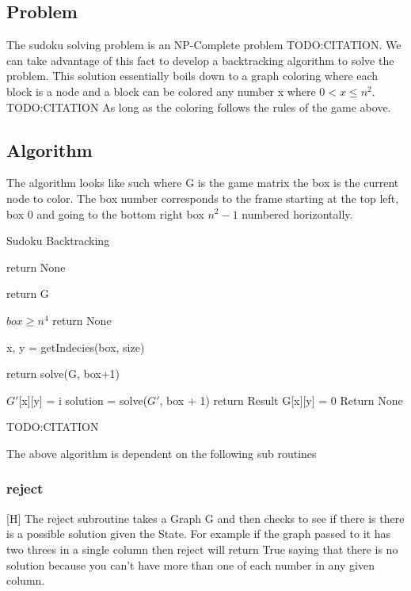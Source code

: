 \documentclass{sig-alternate}
\begin{document}
\subsection{Problem}
The sudoku solving problem is an NP-Complete problem TODO:CITATION. We can take
advantage of this fact to develop a backtracking algorithm to solve the problem. This solution
essentially boils down to a graph coloring where each block is a node and a block can be colored any number x where $0 < x \le n^2$. TODO:CITATION
As long as the coloring follows the rules of the game above. 

\subsection{Algorithm}
The algorithm looks like such where G is the game matrix the box is the current node to color. The box number corresponds to the frame starting at the top left, box 0 and going to the bottom right box $n^2 - 1$ numbered horizontally.

\begin{algorithm}
\caption{Sudoku Backtracking}\label{solve}
\begin{algorithmic}[1]

\State return None
\EndIf

\State return G
\EndIf

\If $box \ge n^4$
\State return None
\EndIf

\State x, y = getIndecies(box, size)

\State return solve(G, box+1)
\EndIf

\State $G'$[x][y] = i
\State solution = solve($G'$, box + 1)
\State return Result
\EndIf
\EndFor
\State G[x][y] = 0
\State Return None
\EndProcedure
\end{algorithmic}
\end{algorithm}
TODO:CITATION

The above algorithm is dependent on the following sub routines

\subsubsection{reject}[H]
The reject subroutine takes a Graph G and then checks to see if there is there is
a possible solution given the State. For example if the graph passed to it has two threes in a single column then reject will return True saying that there is no solution because you can't have more than one of each number in any given column. 
\end{document}
